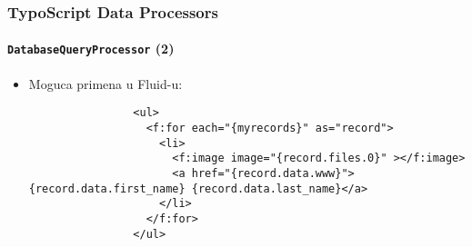 \begin{frame}[fragile]
	\frametitle{TypoScript Data Processors}
	\framesubtitle{\texttt{DatabaseQueryProcessor} (2)}

	\lstset{basicstyle=\tiny\ttfamily}

	\begin{itemize}

		\item Moguca primena u Fluid-u:

			\begin{lstlisting}
				<ul>
				  <f:for each="{myrecords}" as="record">
				    <li>
				      <f:image image="{record.files.0}" ></f:image>
				      <a href="{record.data.www}">{record.data.first_name} {record.data.last_name}</a>
				    </li>
				  </f:for>
				</ul>
			\end{lstlisting}

	\end{itemize}

\end{frame}


